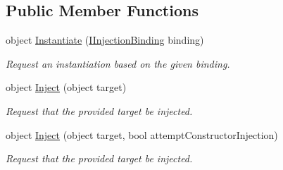 \subsection*{Public Member Functions}
\begin{DoxyCompactItemize}
\item 
object \hyperlink{classstrange_1_1extensions_1_1injector_1_1impl_1_1_injector_af2e993fb61630c887d378d36b19bac6f}{Instantiate} (\hyperlink{interfacestrange_1_1extensions_1_1injector_1_1api_1_1_i_injection_binding}{I\-Injection\-Binding} binding)
\begin{DoxyCompactList}\small\item\em Request an instantiation based on the given binding. \end{DoxyCompactList}\item 
\hypertarget{classstrange_1_1extensions_1_1injector_1_1impl_1_1_injector_a8e68bee15edd6eae305e1e2a4f24ff6c}{object \hyperlink{classstrange_1_1extensions_1_1injector_1_1impl_1_1_injector_a8e68bee15edd6eae305e1e2a4f24ff6c}{Inject} (object target)}\label{classstrange_1_1extensions_1_1injector_1_1impl_1_1_injector_a8e68bee15edd6eae305e1e2a4f24ff6c}

\begin{DoxyCompactList}\small\item\em Request that the provided target be injected. \end{DoxyCompactList}\item 
\hypertarget{classstrange_1_1extensions_1_1injector_1_1impl_1_1_injector_ae6df3d7fb5fc7d18a2ca9c2c8e754783}{object \hyperlink{classstrange_1_1extensions_1_1injector_1_1impl_1_1_injector_ae6df3d7fb5fc7d18a2ca9c2c8e754783}{Inject} (object target, bool attempt\-Constructor\-Injection)}\label{classstrange_1_1extensions_1_1injector_1_1impl_1_1_injector_ae6df3d7fb5fc7d18a2ca9c2c8e754783}

\begin{DoxyCompactList}\small\item\em Request that the provided target be injected. \end{DoxyCompactList}\end{DoxyCompactItemize}
